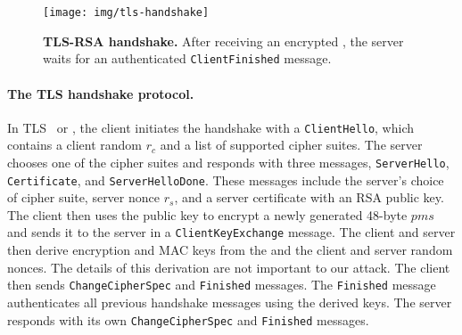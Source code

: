 %



\ifsubmit\relax\else
\begin{figure}
	\texttt{[image: img/tls-handshake]} 
	\caption{\textbf{TLS-RSA handshake.} After receiving an encrypted \pms, the server waits for an authenticated \texttt{ClientFinished} message.}
	\label{fig:tls-handshake}
\end{figure}
\fi

\paragraph{The TLS handshake protocol.}
In TLS~\cite{rfc5246} or \sslthree, the client initiates the handshake with a \texttt{ClientHello}, which contains a client random $r_c$ and a list of supported cipher suites. The server chooses one of the cipher suites and responds with three messages, \texttt{ServerHello}, \texttt{Certificate}, and \texttt{ServerHelloDone}. These messages include the server's choice of cipher suite, server nonce $r_s$, and a server certificate with an RSA public key. The client then uses the public key to encrypt a newly generated 48-byte \pms $pms$ and sends it to the server in a \texttt{ClientKeyExchange} message. The client and server then derive encryption and MAC keys from the \pms and the client and server random nonces. The details of this derivation are not important to our attack.  The client then sends \texttt{ChangeCipherSpec} and \texttt{Finished} messages. The \texttt{Finished} message authenticates all previous handshake messages using the derived keys. The server responds with its own \texttt{ChangeCipherSpec} and \texttt{Finished} messages.

